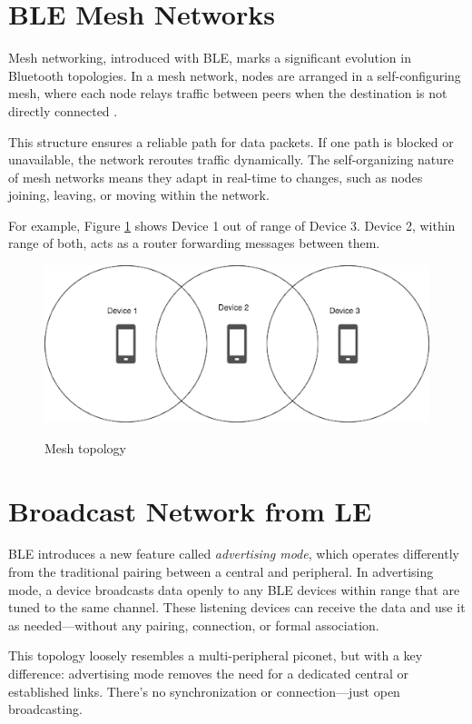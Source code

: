 \section{BLE Mesh Networks}

Mesh networking, introduced with BLE, marks a significant evolution in Bluetooth topologies. In a mesh network, nodes are arranged in a self-configuring mesh, where each node relays traffic between peers when the destination is not directly connected \cite{buildingBLEsystems}.

This structure ensures a reliable path for data packets. If one path is blocked or unavailable, the network reroutes traffic dynamically. The self-organizing nature of mesh networks means they adapt in real-time to changes, such as nodes joining, leaving, or moving within the network.

For example, Figure \ref{fig:mesh} shows Device 1 out of range of Device 3. Device 2, within range of both, acts as a router forwarding messages between them.
\begin{figure}[h]
    \caption{Mesh topology}
    \includegraphics{mesh.png}
    \label{fig:mesh}
    \end{figure}

\section{Broadcast Network from LE}

BLE introduces a new feature called \textit{advertising mode}, which operates differently from the traditional pairing between a central and peripheral. In advertising mode, a device broadcasts data openly to any BLE devices within range that are tuned to the same channel. These listening devices can receive the data and use it as needed—without any pairing, connection, or formal association.

This topology loosely resembles a multi-peripheral piconet, but with a key difference: advertising mode removes the need for a dedicated central or established links. There’s no synchronization or connection—just open broadcasting.

